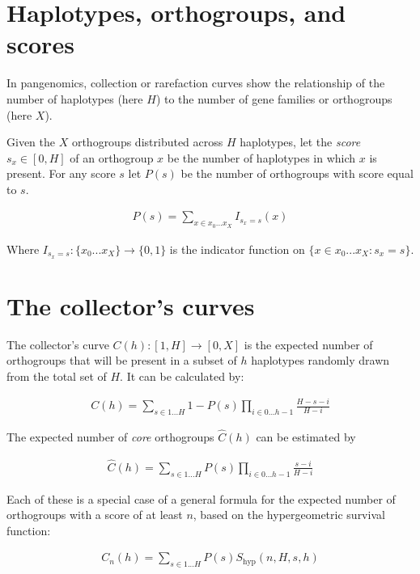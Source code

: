 \documentclass[12pt]{scrartcl}
\begin{document}
\maketitle

\section*{Haplotypes, orthogroups, and scores}

In pangenomics, collection or rarefaction curves show the relationship of the number of haplotypes (here $H$) to the number of gene families or orthogroups (here $X$).

Given the $X$ orthogroups distributed across $H$ haplotypes, let the \emph{score} $s_x \in [0,H]$ of an orthogroup $x$ be the number of haplotypes in which $x$ is present. For any score $s$ let $P(s)$ be the number of orthogroups with score equal to $s$. 

\begin{align}
    P(s) = \sum_{x \in x_0 ... x_X} I_{s_x=s}(x)
\end{align}

Where $I_{s_x=s} : \{x_0 ... x_X\} \rightarrow \{0,1\}$ is the indicator function on $\{x \in x_0 ... x_X : s_x=s\}$. 

\section*{The collector's curves}

The collector's curve $C(h):[1,H] \rightarrow [0,X]$ is the expected number of orthogroups that will be present in a subset of $h$ haplotypes randomly drawn from the total set of $H$. It can be calculated by:

\begin{align}
    C(h) = \sum_{s \in 1...H} 1 - P(s)\prod_{i \in 0...h-1}\frac{H-s-i}{H-i}
\end{align}

The expected number of \emph{core} orthogroups $\hat{C}(h)$ can be estimated by

\begin{align}
    \hat{C}(h) = \sum_{s \in 1...H} P(s)\prod_{i \in 0...h-1}\frac{s-i}{H-i}
\end{align}

Each of these  is a special case of a general formula for the expected number of orthogroups with a score of at least $n$, based on the hypergeometric survival function:

\begin{align}
    C_n(h) = \sum_{s \in 1...H}P(s)S_\text{hyp}(n, H, s, h)
\end{align}
\end{document}
